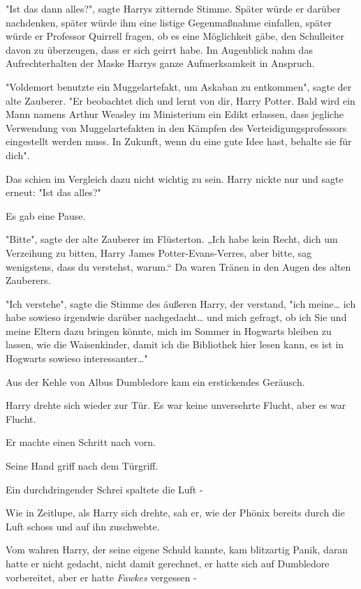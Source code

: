 {"Ist das dann alles?", sagte Harrys zitternde Stimme. Später würde er darüber nachdenken, später würde ihm eine listige Gegenmaßnahme einfallen, später würde er Professor Quirrell fragen, ob es eine Möglichkeit gäbe, den Schulleiter davon zu überzeugen, dass er sich geirrt habe. Im Augenblick nahm das Aufrechterhalten der Maske Harrys ganze Aufmerksamkeit in Anspruch.

"Voldemort benutzte ein Muggelartefakt, um Askaban zu entkommen", sagte der alte Zauberer. "Er beobachtet dich und lernt von dir, Harry Potter. Bald wird ein Mann namens Arthur Weasley im Ministerium ein Edikt erlassen, dass jegliche Verwendung von Muggelartefakten in den Kämpfen des Verteidigungsprofessors eingestellt werden muss. In Zukunft, wenn du eine gute Idee hast, behalte sie für dich".

Das schien im Vergleich dazu nicht wichtig zu sein. Harry nickte nur und sagte erneut: "Ist das alles?"

Es gab eine Pause.

"Bitte", sagte der alte Zauberer im Flüsterton. „Ich habe kein Recht, dich um Verzeihung zu bitten, Harry James Potter-Evans-Verres, aber bitte, sag wenigstens, dass du verstehst, warum.“ Da waren Tränen in den Augen des alten Zauberers.

"Ich verstehe", sagte die Stimme des äußeren Harry, der verstand, "ich meine… ich habe sowieso irgendwie darüber nachgedacht… und mich gefragt, ob ich Sie und meine Eltern dazu bringen könnte, mich im Sommer in Hogwarts bleiben zu lassen, wie die Waisenkinder, damit ich die Bibliothek hier lesen kann, es ist in Hogwarts sowieso interessanter…"

Aus der Kehle von Albus Dumbledore kam ein erstickendes Geräusch.

Harry drehte sich wieder zur Tür. Es war keine unversehrte Flucht, aber es war Flucht.

Er machte einen Schritt nach vorn.

Seine Hand griff nach dem Türgriff.

Ein durchdringender Schrei spaltete die Luft -

Wie in Zeitlupe, als Harry sich drehte, sah er, wie der Phönix bereits durch die Luft schoss und auf ihn zuschwebte.

Vom wahren Harry, der seine eigene Schuld kannte, kam blitzartig Panik, daran hatte er nicht gedacht, nicht damit gerechnet, er hatte sich auf Dumbledore vorbereitet, aber er hatte \emph{Fawkes} vergessen -

}
